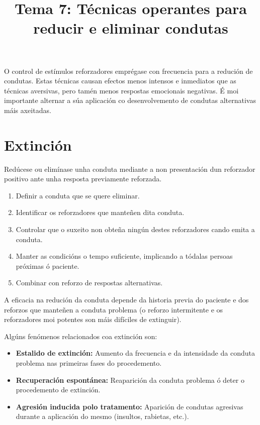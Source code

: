 \documentclass[a4paper,11pt]{article}
\title{Tema 7: Técnicas operantes para reducir e eliminar condutas}
\date{}
\begin{document}
   

\maketitle 

O control de estímulos reforzadores emprégase con frecuencia para a redución de condutas. Estas técnicas causan efectos menos intensos e inmediatos que as técnicas aversivas, pero tamén menos respostas emocionais negativas. É moi importante alternar a súa aplicación co desenvolvemento de condutas alternativas máis axeitadas. 

\section{Extinción}
Redúcese ou elimínase unha conduta mediante a non presentación dun reforzador positivo ante unha resposta previamente reforzada.
\begin{enumerate}
	\item Definir a conduta que se quere eliminar.
	\item Identificar os reforzadores que manteñen dita conduta.
	\item Controlar que o suxeito non obteña ningún destes reforzadores cando emita a conduta.
	\item Manter as condicións o tempo suficiente, implicando a tódalas persoas próximas ó paciente.
	\item Combinar con reforzo de respostas alternativas.
\end{enumerate}

A eficacia na redución da conduta depende da historia previa do paciente e dos reforzos que manteñen a conduta problema (o reforzo intermitente e os reforzadores moi potentes son máis difíciles de extinguir). 

Algúns fenómenos relacionados coa extinción son:
\begin{itemize}
	\item \textbf{Estalido de extinción:} Aumento da frecuencia e da intensidade da conduta problema 
	nas primeiras fases do procedemento.
	\item \textbf{Recuperación espontánea:} Reaparición da conduta problema ó deter o procedemento de
	extinción.
	\item \textbf{Agresión inducida polo tratamento:} Aparición de condutas agresivas durante a 
	aplicación do mesmo (insultos, rabietas, etc.).
\end{itemize}
\end{document}
